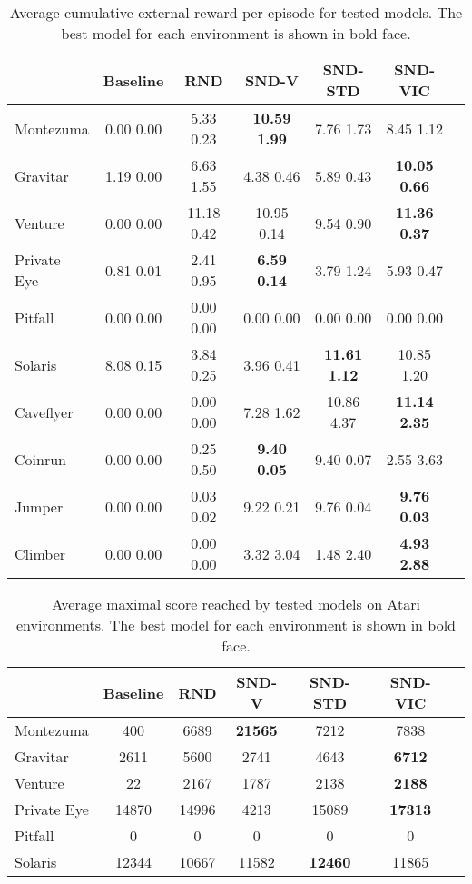 \documentclass[a4paper,11pt]{elsarticle}
\begin{document}
\begin{table}[thb]
\scriptsize
\centering
\caption{Average cumulative external reward per episode for tested models. The best model for each environment is shown in bold face.}
\begin{tabular}{l|cccccc}
\hline
 & Baseline & RND & SND-V & SND-STD & SND-VIC \\
\hline\hline
Montezuma & 0.00  0.00 & 5.33  0.23 & \textbf{10.59  1.99} & 7.76  1.73 & 8.45  1.12 \\
Gravitar & 1.19  0.00 & 6.63  1.55 & 4.38  0.46 & 5.89  0.43 &\textbf{ 10.05  0.66} \\
Venture & 0.00  0.00 & 11.18  0.42 & 10.95  0.14 & 9.54  0.90 & \textbf{11.36  0.37} \\ 
Private Eye & 0.81  0.01 & 2.41  0.95 & \textbf{6.59  0.14} & 3.79  1.24 & 5.93  0.47  \\ 
Pitfall & 0.00  0.00 & 0.00  0.00 & 0.00  0.00 & 0.00  0.00 & 0.00  0.00 \\ 
Solaris & 8.08  0.15 & 3.84  0.25 & 3.96  0.41 & \textbf{11.61  1.12} & 10.85  1.20  \\
Caveflyer & 0.00  0.00 & 0.00  0.00 & 7.28  1.62 & 10.86  4.37 & \textbf{11.14  2.35} \\
Coinrun & 0.00  0.00 & 0.25  0.50 & \textbf{9.40  0.05} & 9.40  0.07 & 2.55  3.63  \\
Jumper & 0.00  0.00 & 0.03  0.02 & 9.22  0.21 & 9.76  0.04 & \textbf{9.76  0.03}\\
Climber & 0.00  0.00 & 0.00  0.00 & 3.32  3.04 & 1.48  2.40 & \textbf{4.93  2.88} \\
\hline
\end{tabular}
\label{tab:res2}
\end{table}

\begin{table}[thb]
\scriptsize
\centering
\caption{Average maximal score reached by tested models on Atari environments. The best model for each environment is shown in bold face.}
\begin{tabular}{l|cccccc}
\hline
 & Baseline & RND & SND-V & SND-STD & SND-VIC \\
\hline\hline
Montezuma & 400 & 6689 & \textbf{21565} & 7212 & 7838 \\
Gravitar & 2611 & 5600 & 2741 & 4643 & \textbf{6712} \\
Venture & 22 & 2167 & 1787 & 2138 & \textbf{2188}  \\ 
Private Eye & 14870 & 14996 & 4213 & 15089 & \textbf{17313} \\ 
Pitfall & 0 & 0 & 0 & 0 & 0 \\ 
Solaris & 12344 & 10667 & 11582 & \textbf{12460} & 11865 \\ 
\hline
\end{tabular}
\label{tab:res3}
\end{table}
\end{document}
